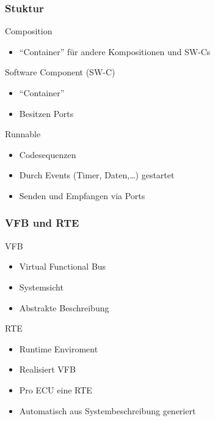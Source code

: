 \documentclass[]{beamer}
\begin{document}
\begin{frame}
\frametitle{Stuktur}
    \begin{block}{Composition}
        \begin{itemize}
            \item "`Container"' für andere Kompositionen und SW-Cs
        \end{itemize}
    \end{block}
    \begin{block}{Software Component (SW-C)}
        \begin{itemize}
            \item "`Container"'
            \item Besitzen Ports
        \end{itemize}
    \end{block}
    \begin{block}{Runnable}
        \begin{itemize}
            \item Codesequenzen
            \item Durch Events (Timer, Daten,\dots) gestartet
            \item Senden und Empfangen via Ports
        \end{itemize}
    \end{block}
\end{frame}

\begin{frame}
\frametitle{VFB und RTE}
    \begin{block}{VFB}
        \begin{itemize}
            \item Virtual Functional Bus
            \item Systemsicht
            \item Abstrakte Beschreibung
        \end{itemize}
    \end{block}
    \begin{block}{RTE}
        \begin{itemize}
            \item Runtime Enviroment
            \item Realisiert VFB
            \item Pro ECU eine RTE
            \item Automatisch aus Systembeschreibung generiert
        \end{itemize}
    \end{block}
\end{frame}
\end{document}
